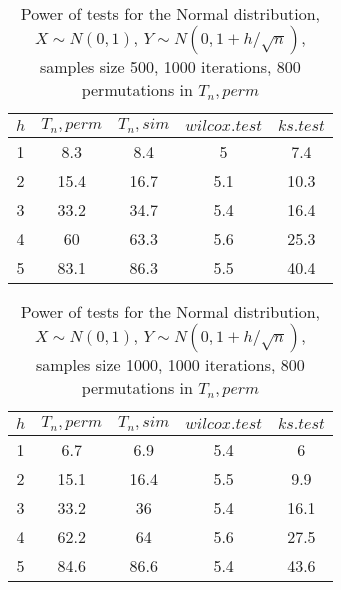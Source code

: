 \documentclass{report}
\begin{document}
\begin{longtable}{|c|c|c|c|c|}
  \caption{Power of tests for the Normal distribution, \\
           $X\sim N(0,1)$, $Y\sim N(0, 1 + h/\sqrt{n})$, \\
           samples size 500, 1000 iterations, 800 permutations in $T_n, perm$} \\
  \hline
  $h$ & $T_n, perm$ & $T_n, sim$ & $wilcox.test$ & $ks.test$ \\
  \hline
  1 & 8.3 & 8.4 & 5 & 7.4 \\
  2 & 15.4 & 16.7 & 5.1 & 10.3 \\
  3 & 33.2 & 34.7 & 5.4 & 16.4 \\
  4 & 60 & 63.3 & 5.6 & 25.3 \\
  5 & 83.1 & 86.3 & 5.5 & 40.4 \\
  \hline
\end{longtable}

\begin{longtable}{|c|c|c|c|c|}
  \caption{Power of tests for the Normal distribution, \\
           $X\sim N(0,1)$, $Y\sim N(0, 1 + h/\sqrt{n})$, \\
           samples size 1000, 1000 iterations, 800 permutations in $T_n, perm$} \\
  \hline
  $h$ & $T_n, perm$ & $T_n, sim$ & $wilcox.test$ & $ks.test$ \\
  \hline
  1 & 6.7 & 6.9 & 5.4 & 6 \\
  2 & 15.1 & 16.4 & 5.5 & 9.9 \\
  3 & 33.2 & 36 & 5.4 & 16.1 \\
  4 & 62.2 & 64 & 5.6 & 27.5 \\
  5 & 84.6 & 86.6 & 5.4 & 43.6 \\
  \hline
\end{longtable}
\end{document}
